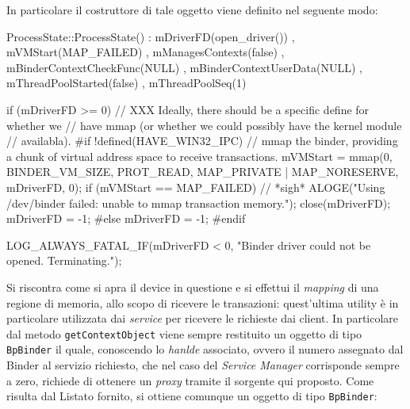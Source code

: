 In particolare il costruttore di tale oggetto viene definito nel seguente modo:
\begin{cpp}[caption=$ $(1) ProcessState.cpp ]
ProcessState::ProcessState()
    : mDriverFD(open_driver())
    , mVMStart(MAP_FAILED)
    , mManagesContexts(false)
    , mBinderContextCheckFunc(NULL)
    , mBinderContextUserData(NULL)
    , mThreadPoolStarted(false)
    , mThreadPoolSeq(1)
{
    if (mDriverFD >= 0) {
        // XXX Ideally, there should be a specific define for whether we
        // have mmap (or whether we could possibly have the kernel module
        // availabla).
#if !defined(HAVE_WIN32_IPC)
        // mmap the binder, providing a chunk of virtual address space to receive transactions.
        mVMStart = mmap(0, BINDER_VM_SIZE, PROT_READ, MAP_PRIVATE | MAP_NORESERVE, mDriverFD, 0);
        if (mVMStart == MAP_FAILED) {
            // *sigh*
            ALOGE("Using /dev/binder failed: unable to mmap transaction memory.\n");
            close(mDriverFD);
            mDriverFD = -1;
        }
#else
        mDriverFD = -1;
#endif
    }

    LOG_ALWAYS_FATAL_IF(mDriverFD < 0, "Binder driver could not be opened.  Terminating.");
}
\end{cpp}
Si riscontra come si apra il device in questione e si effettui il \textit{mapping}
di una regione di memoria, allo scopo di ricevere le transazioni: quest'ultima
utility è in particolare utilizzata dai \textit{service}
per ricevere le richieste dai client. In particolare dal metodo \texttt{\small getContextObject}
viene sempre restituito un oggetto di tipo \texttt{\small BpBinder} il quale,
conoscendo lo \textit{hanlde} associato, ovvero il numero assegnato dal Binder
al servizio richiesto, che nel caso del \textit{Service Manager} corrisponde
sempre a zero, richiede di ottenere un \textit{proxy} tramite il sorgente qui proposto. 
Come risulta dal Listato fornito, si ottiene
comunque un oggetto di tipo \texttt{\small BpBinder}:
